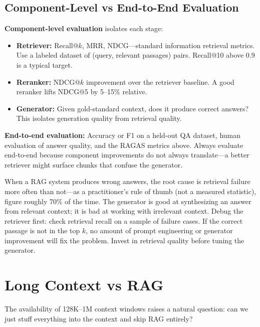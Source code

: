 \subsection{Component-Level vs End-to-End Evaluation}

\textbf{Component-level evaluation} isolates each stage:
\begin{itemize}
    \item \textbf{Retriever:} Recall@$k$, MRR, NDCG---standard information retrieval metrics. Use a labeled dataset of (query, relevant passages) pairs. Recall@10 above 0.9 is a typical target.
    \item \textbf{Reranker:} NDCG@$k$ improvement over the retriever baseline. A good reranker lifts NDCG@5 by 5--15\% relative.
    \item \textbf{Generator:} Given gold-standard context, does it produce correct answers? This isolates generation quality from retrieval quality.
\end{itemize}

\textbf{End-to-end evaluation:} Accuracy or F1 on a held-out QA dataset, human evaluation of answer quality, and the RAGAS metrics above. Always evaluate end-to-end because component improvements do not always translate---a better retriever might surface chunks that confuse the generator.

\begin{keyinsight}
When a RAG system produces wrong answers, the root cause is retrieval failure more often than not---as a practitioner's rule of thumb (not a measured statistic), figure roughly 70\% of the time. The generator is good at synthesizing an answer from relevant context; it is bad at working with irrelevant context. Debug the retriever first: check retrieval recall on a sample of failure cases. If the correct passage is not in the top $k$, no amount of prompt engineering or generator improvement will fix the problem. Invest in retrieval quality before tuning the generator.
\end{keyinsight}

\section{Long Context vs RAG}
\label{sec:long_context_vs_rag}

The availability of 128K--1M context windows raises a natural question: can we just stuff everything into the context and skip RAG entirely?

